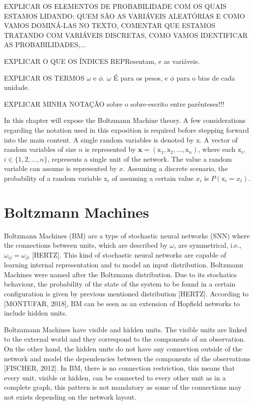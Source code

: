 EXPLICAR OS ELEMENTOS DE PROBABILIDADE COM OS QUAIS ESTAMOS LIDANDO:%
QUEM S\~{A}O AS VARI\'{A}VEIS ALEAT\'{O}RIAS E COMO VAMOS DOMIN\'{A}-LAS NO TEXTO,
COMENTAR QUE ESTAMOS TRATANDO COM VARI\'{A}VEIS DISCRETAS, COMO VAMOS IDENTIFICAR AS PROBABILIDADES,$\ldots$

EXPLICAR O QUE OS \'{I}NDICES REPResentam, e as vari\'{a}veis.

EXPLICAR OS TERMOS $\omega$ e $\phi$. $\omega$ \'{E} para os pesos, e $\phi$ para o bias de cada unidade.

EXPLICAR MINHA NOTA\c{C}\~{A}O sobre o sobre-escrito entre par\^{e}nteses!!!


In this chapter will expose the Boltzmann Machine theory. 
A few considerations regarding the notation used in this exposition is required before stepping forward into the main content. 
A single random variables is denoted by $\mathrm{x}$.
A vector of random variables of size $n$ is represented by $\mathrm{\mathbf{x}} = (\mathrm{x}_{1}, \mathrm{x}_{2}, \dots, \mathrm{x}_{n})$, where each $\mathrm{x}_{i}$, $i \in \{1, 2, \dots, n\}$, represents a single unit of the network. 
The value a random variable can assume is represented by $x$. 
Assuming a discrete scenario, the probability of a random variable $\mathrm{x}_{i}$ of assuming a certain value $x_{i}$ is $P(\mathrm{x}_{i} = x_{i})$. 



\section{Boltzmann Machines}

Boltzmann Machines (BM) are a type of stochastic neural networks (SNN) where the connections between units, which are described by $\omega$, are symmetrical, i.e., $\omega_{ij} = \omega_{ji}$ [HERTZ].
This kind of stochastic neural networks are capable of learning internal representation and to model an input distribution.
Boltzmann Machines were named after the Boltzmann distribution.
Due to its stochatics behaviour, the probability of the state of the system to be found in a certain configuration is given by previous mentioned distribution [HERTZ].
According to [MONTUFAR, 2018], BM can be seen as an extension of Hopfield networks to include hidden units.


Boltzamann Machines have visible and hidden units.
The visible units are linked to the external world and they correspond to the components of an observation. On the other hand, the hidden units do not have any connection outside of the network and model the dependencies between the components of the observations [FISCHER, 2012].
In BM, there is no connection restriction, this means that every unit, visible or hidden, can be connected to every other unit as in a complete graph, this pattern is not mandatory as some of the connections may not exists depending on the network layout.

